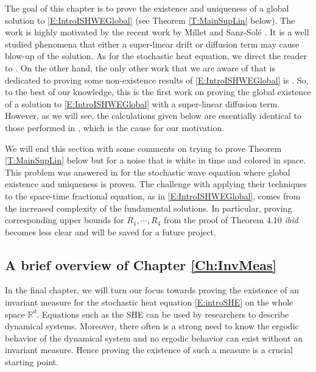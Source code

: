 \documentclass[12pt]{report}
\theoremstyle{plain}
\theoremstyle{definition}
\numberwithin{equation}{section}
\newcommand{\R}{\mathbb{R}}
\begin{document}
The goal of this chapter is to prove the existence and uniqueness of a global solution to \eqref{E:IntroISHWEGlobal}  (see Theorem \ref{T:MainSupLin} below). The work is highly motivated by the recent work by Millet and Sanz-Sol\'e \cite{millet.sanz-sole:21:global}. It is a well studied phenomena that either a super-linear drift or diffusion term may cause blow-up of the solution. As for the stochastic heat equation, we direct the reader to \cite{foondun.nualart:21:osgood, mueller.sowers:93:blowup, dalang.khoshnevisan.ea:19:global, bonder.groisman:09:global}. On the other hand, the only other work that we are aware of that is dedicated to proving some non-existence results of \eqref{E:IntroISHWEGlobal} is \cite{asogwa.mijena.ea:20:blow-up}. So, to the best of our knowledge, this is the first work on proving the global existence of a solution to \eqref{E:IntroISHWEGlobal} with a super-linear diffusion term. However, as we will see, the calculations given below are essentially identical to those performed in \cite{millet.sanz-sole:21:global}, which is the cause for our motivation.

We will end this section with some comments on trying to prove Theorem \ref{T:MainSupLin} below but for a noise that is white in time and colored in space. This problem was answered in \cite[Theorem 4.13]{millet.sanz-sole:21:global} for the stochastic wave equation where global existence and uniqueness is proven. The challenge with applying their techniques to the space-time fractional equation, as in \eqref{E:IntroISHWEGlobal}, comes from the increased complexity of the fundamental solutions. In particular, proving corresponding upper bounds for $R_1, \cdots, R_4$ from the proof of Theorem 4.10 {\em ibid} becomes less clear and will be saved for a future project. 

\subsection{A brief overview of Chapter \ref{Ch:InvMeas}}
In the final chapter, we will turn our focus towards proving the existence of an invariant measure for the stochastic heat equation \eqref{E:introSHE} on the whole space $\R^d$. Equations such as the SHE can be used by researchers to describe dynamical systems. Moreover, there often is a strong need to know the ergodic behavior of the dynamical system and no ergodic behavior can exist without an invariant measure. Hence proving the existence of such a measure is a crucial starting point. 
\end{document}
